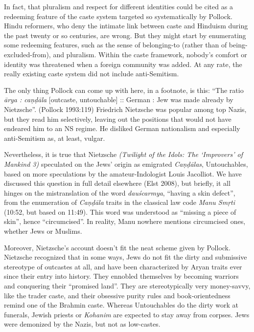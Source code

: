 In fact, that pluralism and respect for different identities could be cited as a redeeming feature of the caste system targeted so systematically by Pollock. Hindu reformers, who deny the intimate link between caste and Hinduism during the past twenty or so centuries, are wrong. But they might start by enumerating some redeeming features, such as the sense of belonging-to (rather than of being-excluded-from), and pluralism. Within the caste framework, nobody’s comfort or identity was threatened when a foreign community was added. At any rate, the really existing caste system did not include anti-Semitism.

The only thing Pollock can come up with here, in a footnote, is this: “The ratio {\sl ārya : caṇḍāla} [outcaste, untouchable] :: German : Jew was made already by Nietzsche”. (Pollock 1993:119) Friedrich Nietzsche was popular among top Nazis, but they read him selectively, leaving out the positions that would not have endeared him to an NS regime. He disliked German nationalism and especially anti-Semitism as, at least, vulgar.

Nevertheless, it is true that Nietzsche {\sl (Twilight of the Idols: The ‘Improvers’ of Mankind 3)} speculated on the Jews’ origin as emigrated {\sl Caṇḍālas}, Untouchables, based on more speculations by the amateur-Indologist Louis Jacolliot. We have discussed this question in full detail elsewhere (Elst 2008), but briefly, it all hinges on the mistranslation of the word {\sl dauścarmya}, “having a skin defect”, from the enumeration of {\sl Caṇḍāla} traits in the classical law code {\sl Manu Smṛti} (10:52, but based on 11:49). This word was understood as “missing a piece of skin”, hence “circumcised”. In reality, Manu nowhere mentions circumcised ones, whether Jews or Muslims.

Moreover, Nietzsche’s account doesn’t fit the neat scheme given by Pollock. Nietzsche recognized that in some ways, Jews do not fit the dirty and submissive stereotype of outcastes at all, and have been characterized by Aryan traits ever since their entry into history. They ennobled themselves by becoming warriors and conquering their “promised land”. They are stereotypically very money-savvy, like the trader caste, and their obsessive purity rules and book-orientedness remind one of the Brahmin caste. Whereas Untouchables do the dirty work at funerals, Jewish priests or {\sl Kohanim} are expected to stay away from corpses. Jews were demonized by the Nazis, but not as low-castes.

